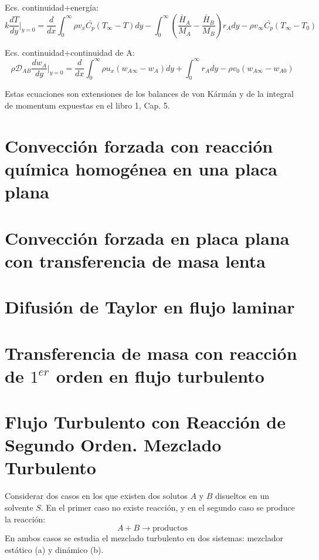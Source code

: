 Ecs. continuidad+energía:
\begin{equation}
    k \frac{dT}{dy} \bigg|_{y=0} = \frac{d}{dx} \int_{0}^{\infty} \rho v_x \bar{C_p} (T_{\infty} - T) dy
    - \int_{0}^{\infty} \left( \frac{\bar{H}_A}{M_A} - \frac{\bar{H}_B}{M_B} \right) r_A dy
    - \rho v_{\infty} \bar{C_p} (T_{\infty} - T_0) 
    \label{3.6}
\end{equation}

Ecs. continuidad+continuidad de A:
\begin{equation}
    \rho \mathscr {D}_{AB} \frac{dw_A}{dy} \bigg|_{y=0} = \frac{d}{dx} \int_{0}^{\infty} \rho u_x (w_{A\infty} - w_A) dy
    + \int_{0}^{\infty} r_A dy - \rho v_{0} (w_{A\infty} - w_{A0})
    \label{3.7}
\end{equation}

Estas ecuaciones son extensiones de los balances de von Kármán y de la integral de momentum expuestas en el libro 1, Cap. 5.

\section{Convección forzada con reacción química homogénea en una placa plana}

\section{Convección forzada en placa plana con transferencia de masa lenta}
\section{Difusión de Taylor en flujo laminar}
\section{Transferencia de masa con reacción de $1^{er}$ orden en flujo turbulento}


\section{Flujo Turbulento con Reacción de Segundo Orden. Mezclado Turbulento}

Considerar dos casos en los que existen dos solutos $A$ y $B$ disueltos en un solvente $S$. En el primer caso no existe reacción, y en el segundo caso se produce la reacción:
\begin{equation*}
    A + B \rightarrow \text{productos}
\end{equation*}
En ambos casos se estudia el mezclado turbulento en dos sistemas: mezclador estático (a) y dinámico (b).

